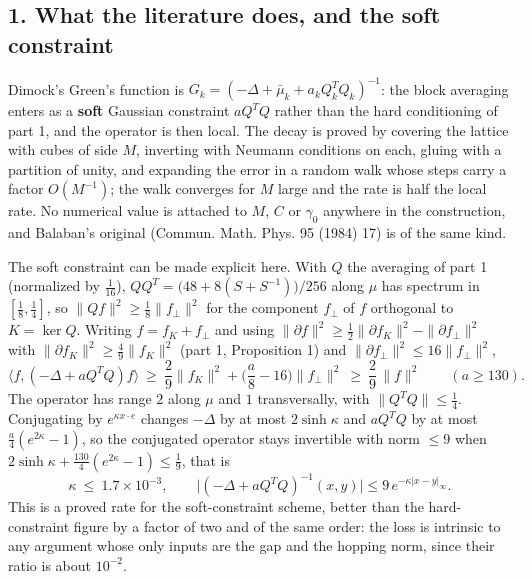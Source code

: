 \documentclass[11pt,a4paper]{article}
\begin{document}
\hypertarget{what-the-literature-does-and-the-soft-constraint}{%
\subsection{1. What the literature does, and the soft
constraint}\label{what-the-literature-does-and-the-soft-constraint}}

Dimock's Green's function is
\(G_k=(-\Delta+\bar\mu_k+a_kQ_k^TQ_k)^{-1}\): the block averaging enters
as a \textbf{soft} Gaussian constraint \(aQ^TQ\) rather than the hard
conditioning of part 1, and the operator is then local. The decay is
proved by covering the lattice with cubes of side \(M\), inverting with
Neumann conditions on each, gluing with a partition of unity, and
expanding the error in a random walk whose steps carry a factor
\(O(M^{-1})\); the walk converges for \(M\) large and the rate is half
the local rate. No numerical value is attached to \(M\), \(C\) or
\(\gamma_0\) anywhere in the construction, and Balaban's original
(Commun. Math. Phys. 95 (1984) 17) is of the same kind.

The soft constraint can be made explicit here. With \(Q\) the averaging
of part 1 (normalized by \(\tfrac1{16}\)),
\(QQ^T=\big(48+8(S+S^{-1})\big)/256\) along \(\mu\) has spectrum in
\([\tfrac18,\tfrac14]\), so \(\|Qf\|^2\ge\tfrac18\|f_\perp\|^2\) for the
component \(f_\perp\) of \(f\) orthogonal to \(K=\ker Q\). Writing
\(f=f_K+f_\perp\) and using
\(\|\partial f\|^2\ge\tfrac12\|\partial f_K\|^2-\|\partial f_\perp\|^2\)
with \(\|\partial f_K\|^2\ge\tfrac49\|f_K\|^2\) (part 1, Proposition 1)
and \(\|\partial f_\perp\|^2\le16\|f_\perp\|^2\),
\[\big\langle f,(-\Delta+aQ^TQ)f\big\rangle\ \ge\ \frac29\|f_K\|^2+\Big(\frac a8-16\Big)\|f_\perp\|^2
\ \ge\ \frac29\,\|f\|^2\qquad(a\ge130).\] The operator has range \(2\)
along \(\mu\) and \(1\) transversally, with \(\|Q^TQ\|\le\tfrac14\).
Conjugating by \(e^{\kappa x\cdot e}\) changes \(-\Delta\) by at most
\(2\sinh\kappa\) and \(aQ^TQ\) by at most \(\tfrac a4(e^{2\kappa}-1)\),
so the conjugated operator stays invertible with norm \(\le9\) when
\(2\sinh\kappa+\tfrac{130}4(e^{2\kappa}-1)\le\tfrac19\), that is
\[\kappa\ \le\ 1.7\times10^{-3},\qquad
\big|(-\Delta+aQ^TQ)^{-1}(x,y)\big|\le9\,e^{-\kappa|x-y|_\infty}.\] This
is a proved rate for the soft-constraint scheme, better than the
hard-constraint figure by a factor of two and of the same order: the
loss is intrinsic to any argument whose only inputs are the gap and the
hopping norm, since their ratio is about \(10^{-2}\).
\end{document}
